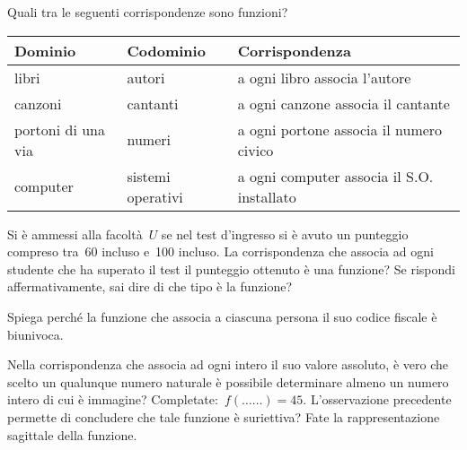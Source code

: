 \begin{esercizio}
 \label{ese:D.4}
Quali tra le seguenti corrispondenze sono funzioni?
\begin{center}
 \begin{tabular}{*3{l}}
 \toprule
  Dominio & Codominio & Corrispondenza\\
\midrule
libri & autori & a ogni libro associa l'autore\\
canzoni & cantanti & a ogni canzone associa il cantante\\
portoni di una via & numeri & a ogni portone associa il numero civico\\
computer & sistemi operativi & a ogni computer associa il S.O. installato\\
\bottomrule
 \end{tabular}
\end{center}
\end{esercizio}

\begin{esercizio}
 \label{ese:D.5}
Si è ammessi alla facoltà~\(U\) se nel test
d'ingresso si è avuto un punteggio compreso tra~60
incluso e~100 incluso. La corrispondenza che associa ad ogni studente
che ha superato il test il punteggio ottenuto è una funzione? Se rispondi
affermativamente, sai dire di che tipo è la funzione?
\end{esercizio}


\begin{esercizio}
 \label{ese:D.6}
Spiega perché la funzione che associa a ciascuna
persona il suo codice fiscale è biunivoca.
\end{esercizio}


\begin{esercizio}
 \label{ese:D.7}
Nella corrispondenza che associa ad ogni intero il suo valore assoluto, 
è vero che scelto un qualunque numero naturale è
possibile determinare almeno un numero intero di cui è immagine?
Completate:~\(f({\ldots}{\ldots}) = 45.\)
L'osservazione precedente permette di concludere che
tale funzione è suriettiva?
Fate la rappresentazione sagittale della funzione.
\end{esercizio}

